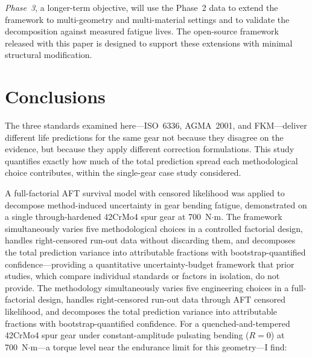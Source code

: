 \documentclass[twocolumn,12pt,a4paper]{article}
\begin{document}
\emph{Phase~3}, a longer-term objective, will use the Phase~2 data to
extend the framework to multi-geometry and multi-material settings and
to validate the decomposition against measured fatigue lives. The
open-source framework released with this paper is designed to support
these extensions with minimal structural modification.

\section{Conclusions}
\label{sec:conclusions}

The three standards examined here---ISO~6336, AGMA~2001, and
FKM---deliver different life predictions for the same gear not because
they disagree on the evidence, but because they apply different
correction formulations. This study quantifies exactly how much of the
total prediction spread each methodological choice contributes, within
the single-gear case study considered.

A full-factorial AFT survival model with censored likelihood was applied
to decompose method-induced uncertainty in gear bending fatigue,
demonstrated on a single through-hardened 42CrMo4 spur gear at
700~N$\cdot$m. The framework simultaneously varies five methodological
choices in a controlled factorial design, handles right-censored run-out
data without discarding them, and decomposes the total prediction
variance into attributable fractions with bootstrap-quantified
confidence---providing a quantitative uncertainty-budget framework that
prior studies, which compare individual standards or factors in isolation,
do not provide.
The methodology
simultaneously varies five engineering choices in a full-factorial
design, handles right-censored run-out data through AFT censored
likelihood, and decomposes the total prediction variance into
attributable fractions with bootstrap-quantified confidence. For a
quenched-and-tempered 42CrMo4 spur gear under constant-amplitude
pulsating bending ($R=0$) at 700~N$\cdot$m---a torque level near the
endurance limit for this geometry---I find:
\end{document}
